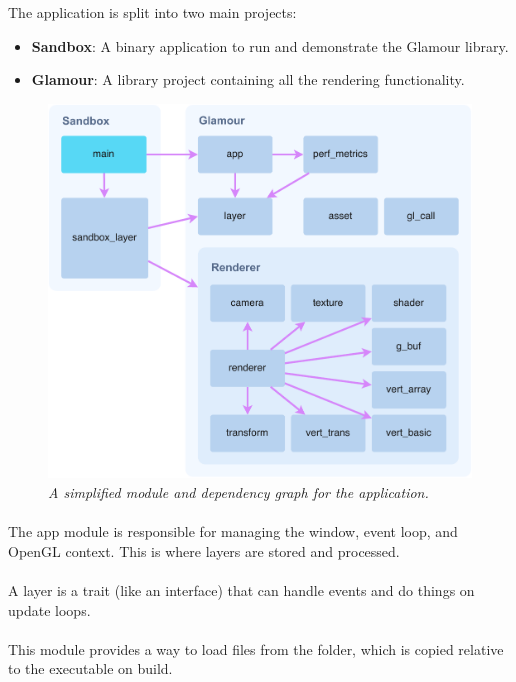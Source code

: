 The application is split into two main projects:
\begin{itemize}
  \item \textbf{Sandbox}: A binary application to run and demonstrate the Glamour library.
  \item \textbf{Glamour}: A library project containing all the rendering functionality.
\end{itemize}

\begin{figure}
  \begin{center}
    \includegraphics[width=0.7\columnwidth]{../module-graph.pdf}
  \end{center}
  \caption[Module graph]{\emph{A simplified module and dependency graph for the application.}}\label{fig:module-graph}
\end{figure}

\paragraph{}
The app module is responsible for managing the window, event loop, and OpenGL context.
This is where layers are stored and processed.

\paragraph{}
A layer is a trait (like an interface) that can handle events and do things on update loops.

\paragraph{}
This module provides a way to load files from the  folder, which is copied relative to the executable on build.

